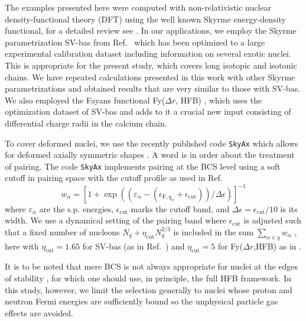 \documentclass[aps,prc,twocolumn,floatfix,nofootinbib,preprintnumbers,superscriptaddress,longbibliography]{revtex4-1}
\begin{document}
The examples presented here were computed with non-relativistic nuclear density-functional theory (DFT) using the well known Skyrme energy-density functional, for a detailed review see \cite{Bender2003}. 
In our applications, we employ the Skyrme parametrization SV-bas from Ref.~\cite{Klu09a}
which has been optimized to a large experimental calibration dataset including information on several exotic nuclei. This is appropriate for the present study, which covers long isotopic and isotonic chains. 
 We have repeated calculations presented in this work  with   other Skyrme parametrizations and obtained results that are very similar to those with SV-bas. We also employed  the Fayans functional Fy($\Delta r$, HFB)
\cite{Rei17a,Mil19}, which uses the optimization dataset of SV-bas and adds to it a crucial new input consisting of differential  charge radii in the calcium chain.


To cover  deformed nuclei, we use the recently published code \texttt{SkyAx} which allows for  deformed axially symmetric shapes \cite{Rei21aR}. A word is in order about the treatment of pairing. The code \texttt{SkyAx} implements pairing at the BCS level 
using a soft cutoff in pairing space with the cutoff profile
as used in Ref.~\cite{Kri90a}
\begin{equation}
  w_\alpha
  =
  \left[1+
    \exp{\left((\varepsilon_\alpha-(\epsilon_{\mathrm{F},q_\alpha}+\epsilon_\mathrm{cut}))
            /\Delta\epsilon\right)}
  \right]^{-1}
\label{eq:softcut}
\end{equation}
where $\varepsilon_\alpha$ are the s.p. energies, 
 $\epsilon_\mathrm{cut}$ marks the cutoff band, and $\Delta\epsilon=\epsilon_\mathrm{cut}/10$ is its width.
We use a dynamical 
setting of the pairing band where $\epsilon_\mathrm{cut}$ is adjusted such
that a fixed number of nucleons $N_q+\eta_\mathrm{cut}N_q^{2/3}$ is
included in the sum $\sum_{\alpha\in q}w_\alpha$ \cite{Ben00a}, here
with $\eta_\mathrm{cut}=1.65$ for SV-bas (as in Ref.~\cite{Klu09a}) and $\eta_\mathrm{cut}=5$ for Fy($\Delta r$,HFB) as in \cite{Rei17a}.

It is to be noted that mere BCS is not always appropriate for nuclei at the edges of stability \cite{Dobaczewski1984,Dobaczewski1996,Mil19}, for which one should use, in principle, the full HFB framework. In this study, however,
we limit  the selection generally to nuclei whose proton and neutron Fermi energies are sufficiently bound  so the unphysical particle gas effects are avoided. 
\end{document}
